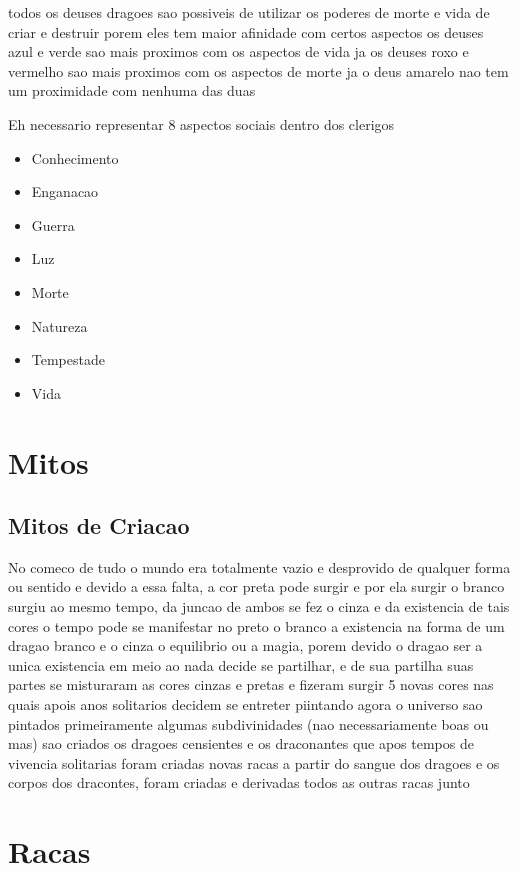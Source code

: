 \documentclass{book}
\begin{document}
todos os deuses dragoes sao possiveis de utilizar os poderes de morte e vida de criar e destruir 
porem eles tem maior afinidade com certos aspectos os deuses azul e verde sao mais proximos com
os aspectos de vida ja os deuses roxo e vermelho sao mais proximos com os aspectos de morte 
ja o deus amarelo nao tem um proximidade com nenhuma das duas 

Eh necessario representar 8 aspectos sociais dentro dos clerigos 
\begin{itemize}
      \item Conhecimento
      \item Enganacao 
      \item Guerra 
      \item Luz 
      \item Morte
      \item Natureza 
      \item Tempestade 
      \item Vida 
\end{itemize}



\part{Mitos}
\chapter{Mitos de Criacao}
No comeco de tudo o mundo era totalmente vazio e desprovido de qualquer forma ou sentido e devido
a essa falta, a cor preta pode surgir e por ela surgir o branco surgiu ao mesmo tempo, da juncao 
de ambos se fez o cinza e da existencia de tais cores o tempo pode se manifestar no preto o 
branco a existencia na forma de um dragao branco e o cinza o equilibrio ou a magia, porem devido
o dragao ser a unica existencia em meio ao nada decide se partilhar, e de sua partilha suas 
partes se misturaram as cores cinzas e pretas e fizeram surgir 5 novas cores nas quais apois 
anos solitarios decidem se entreter piintando agora o universo sao pintados primeiramente 
algumas subdivinidades (nao necessariamente boas ou mas) sao criados os dragoes censientes e os 
draconantes que apos tempos de vivencia solitarias foram criadas novas racas a partir do sangue 
dos dragoes e os corpos dos dracontes, foram criadas e derivadas todos as outras racas junto 

\part{Racas}
\end{document}
